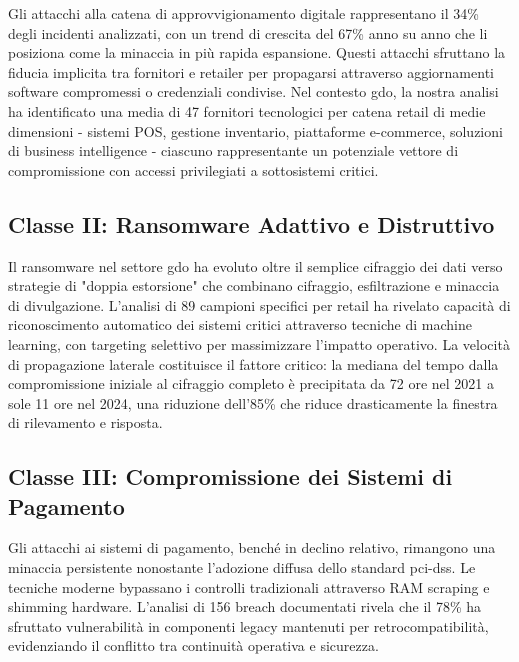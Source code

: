 Gli attacchi alla catena di approvvigionamento digitale rappresentano il 34\% degli incidenti analizzati, con un trend di crescita del 67\% anno su anno che li posiziona come la minaccia in più rapida espansione. Questi attacchi sfruttano la fiducia implicita tra fornitori e retailer per propagarsi attraverso aggiornamenti software compromessi o credenziali condivise. Nel contesto \gls{gdo}, la nostra analisi ha identificato una media di 47 fornitori tecnologici per catena retail di medie dimensioni - sistemi POS, gestione inventario, piattaforme e-commerce, soluzioni di business intelligence - ciascuno rappresentante un potenziale vettore di compromissione con accessi privilegiati a sottosistemi critici.

\subsection{\texorpdfstring{Classe II: Ransomware Adattivo e Distruttivo}{2.3.2 - Classe II: Ransomware Adattivo e Distruttivo}}

Il ransomware nel settore \gls{gdo} ha evoluto oltre il semplice cifraggio dei dati verso strategie di "doppia estorsione" che combinano cifraggio, esfiltrazione e minaccia di divulgazione. L'analisi di 89 campioni specifici per retail ha rivelato capacità di riconoscimento automatico dei sistemi critici attraverso tecniche di machine learning, con targeting selettivo per massimizzare l'impatto operativo. La velocità di propagazione laterale costituisce il fattore critico: la mediana del tempo dalla compromissione iniziale al cifraggio completo è precipitata da 72 ore nel 2021 a sole 11 ore nel 2024, una riduzione dell'85\% che riduce drasticamente la finestra di rilevamento e risposta.

\subsection{\texorpdfstring{Classe III: Compromissione dei Sistemi di Pagamento}{2.3.3 - Classe III: Compromissione dei Sistemi di Pagamento}}

Gli attacchi ai sistemi di pagamento, benché in declino relativo, rimangono una minaccia persistente nonostante l'adozione diffusa dello standard \gls{pci-dss}. Le tecniche moderne bypassano i controlli tradizionali attraverso RAM scraping e shimming hardware. L'analisi di 156 breach documentati rivela che il 78\% ha sfruttato vulnerabilità in componenti legacy mantenuti per retrocompatibilità, evidenziando il conflitto tra continuità operativa e sicurezza.

